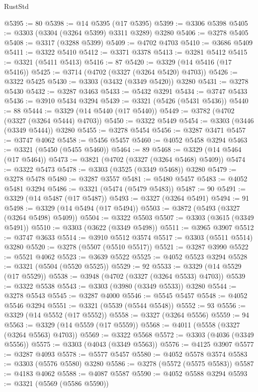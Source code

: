 \begin{lexlean}{RustStd}
\begin{coremodule}
{\begin{coremodule}
{{{{{{{{{{{{{{{{{{{{{{{{{{{{{{{{{@5395 := 80
@5398 := @14 @5395 (@17 @5395)
@5399 := @3306 @5398
@5405 := @3303 (@3304 (@3264 @5399) @3311 @3289) @3280
@5406 := @3278 @5405
@5408 := @3317 (@3288 @5399)
@5409 := @4702 @4703
@5410 := @3686 @5409
@5411 := @3322 @5410
@5412 := @3371 @3378
@5413 := @3281 @5412
@5415 := @3321 (@5411 @5413)
@5416 := 87
@5420 := @3329 (@14 @5416 (@17 @5416))
@5425 := @3714 (@4702 (@3327 (@3264 @5420) @4703))
@5426 := @3322 @5425
@5430 := @3303 (@3432 (@3349 @5420)) @3280
@5431 := @3278 @5430
@5432 := @3287 @3463
@5433 := @5432 @3291
@5434 := @3747 @5433
@5436 := @3910 @5434 @3294
@5439 := @3321 (@5426 (@5431 @5436))
@5440 := 88
@5444 := @3329 (@14 @5440 (@17 @5440))
@5449 := @3782 (@4702 (@3327 (@3264 @5444) @4703))
@5450 := @3322 @5449
@5454 := @3303 (@3446 (@3349 @5444)) @3280
@5455 := @3278 @5454
@5456 := @3287 @3471
@5457 := @3747 @4062
@5458 := @5456 @5457
@5460 := @4052 @5458 @3294
@5463 := @3321 (@5450 (@5455 @5460))
@5464 := 89
@5468 := @3329 (@14 @5464 (@17 @5464))
@5473 := @3821 (@4702 (@3327 (@3264 @5468) @5409))
@5474 := @3322 @5473
@5478 := @3303 (@3525 (@3349 @5468)) @3280
@5479 := @3278 @5478
@5480 := @3287 @3557
@5481 := @5480 @5457
@5483 := @4052 @5481 @3294
@5486 := @3321 (@5474 (@5479 @5483))
@5487 := 90
@5491 := @3329 (@14 @5487 (@17 @5487))
@5493 := @3327 (@3264 @5491)
@5494 := 91
@5498 := @3329 (@14 @5494 (@17 @5494))
@5503 := @3872 (@5493 (@3327 (@3264 @5498) @5409))
@5504 := @3322 @5503
@5507 := @3303 (@3615 (@3349 @5491))
@5510 := @3303 (@3622 (@3349 @5498))
@5511 := @3965 @3907
@5512 := @3747 @3633
@5514 := @3910 @5512 @3574
@5517 := @3303 (@5511 @5514) @3280
@5520 := @3278 (@5507 (@5510 @5517))
@5521 := @3287 @3990
@5522 := @5521 @4062
@5523 := @3639 @5522
@5525 := @4052 @5523 @3294
@5528 := @3321 (@5504 (@5520 @5525))
@5529 := 92
@5533 := @3329 (@14 @5529 (@17 @5529))
@5538 := @3948 (@4702 (@3327 (@3264 @5533) @4703))
@5539 := @3322 @5538
@5543 := @3303 (@3980 (@3349 @5533)) @3280
@5544 := @3278 @5543
@5545 := @3287 @4000
@5546 := @5545 @5457
@5548 := @4052 @5546 @3294
@5551 := @3321 (@5539 (@5544 @5548))
@5552 := 93
@5556 := @3329 (@14 @5552 (@17 @5552))
@5558 := @3327 (@3264 @5556)
@5559 := 94
@5563 := @3329 (@14 @5559 (@17 @5559))
@5568 := @4011 (@5558 (@3327 (@3264 @5563) @4703))
@5569 := @3322 @5568
@5572 := @3303 (@4036 (@3349 @5556))
@5575 := @3303 (@4043 (@3349 @5563))
@5576 := @4125 @3907
@5577 := @3287 @4093
@5578 := @5577 @5457
@5580 := @4052 @5578 @3574
@5583 := @3303 (@5576 @5580) @3280
@5586 := @3278 (@5572 (@5575 @5583))
@5587 := @4183 @4062
@5588 := @4087 @5587
@5590 := @4052 @5588 @3294
@5593 := @3321 (@5569 (@5586 @5590))
}}}}}}}}}}}}}}}}}}}}}}}}}}}}}}}}}
\end{coremodule}}
\end{coremodule}
\end{lexlean}
